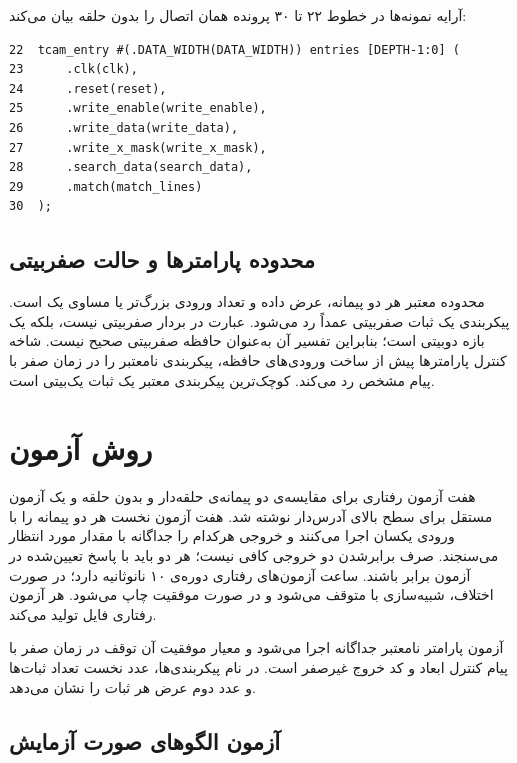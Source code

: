 آرایه نمونه‌ها در خطوط ۲۲ تا ۳۰ پرونده
 همان اتصال را بدون حلقه بیان می‌کند:

\begin{dsdlcodeblock}
\begin{verbatim}
22  tcam_entry #(.DATA_WIDTH(DATA_WIDTH)) entries [DEPTH-1:0] (
23      .clk(clk),
24      .reset(reset),
25      .write_enable(write_enable),
26      .write_data(write_data),
27      .write_x_mask(write_x_mask),
28      .search_data(search_data),
29      .match(match_lines)
30  );
\end{verbatim}
\end{dsdlcodeblock}

\subsection{محدوده پارامترها و حالت صفر‌بیتی}

محدوده معتبر هر دو پیمانه، عرض داده و تعداد ورودی بزرگ‌تر یا مساوی یک است. پیکربندی یک ثبات صفر‌بیتی عمداً رد می‌شود. عبارت  در  بردار صفر‌بیتی نیست، بلکه یک بازه دو‌بیتی است؛ بنابراین تفسیر آن به‌عنوان حافظه صفر‌بیتی صحیح نیست. شاخه کنترل پارامترها پیش از ساخت ورودی‌های حافظه، پیکربندی نامعتبر را در زمان صفر با پیام مشخص رد می‌کند. کوچک‌ترین پیکربندی معتبر یک ثبات یک‌بیتی است.

\section{روش آزمون}

هفت آزمون رفتاری برای مقایسه‌ی دو پیمانه‌ی حلقه‌دار و بدون حلقه و یک آزمون مستقل برای سطح بالای آدرس‌دار نوشته شد. هفت آزمون نخست هر دو پیمانه را با
ورودی یکسان اجرا می‌کنند و خروجی هرکدام را جداگانه با مقدار مورد انتظار می‌سنجند. صرف
برابرشدن دو خروجی کافی نیست؛ هر دو باید با پاسخ تعیین‌شده در آزمون برابر باشند.
ساعت آزمون‌های رفتاری دوره‌ی ۱۰ نانوثانیه دارد؛ در صورت اختلاف، شبیه‌سازی با
 متوقف می‌شود و در صورت موفقیت  چاپ می‌شود. هر آزمون رفتاری
فایل  تولید می‌کند.

آزمون پارامتر نامعتبر جداگانه اجرا می‌شود و معیار موفقیت آن توقف در زمان صفر با
پیام کنترل ابعاد و کد خروج غیرصفر است. در نام پیکربندی‌ها، عدد نخست تعداد ثبات‌ها
و عدد دوم عرض هر ثبات را نشان می‌دهد.

\subsection{آزمون الگوهای  صورت آزمایش}

